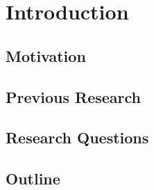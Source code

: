 \chapter{Introduction}

\section{Motivation}

\section{Previous Research}

\section{Research Questions}

\section{Outline}

